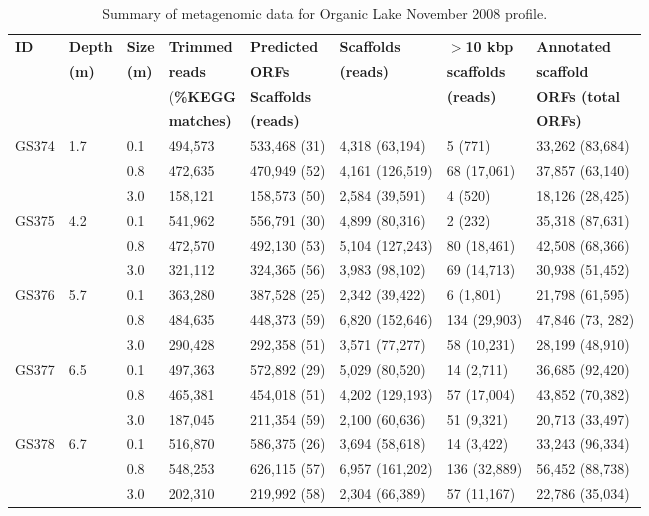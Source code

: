 \begin{table}
\footnotesize
\caption[Summary of metagenomic data for Organic Lake profile]{Summary of metagenomic data for Organic Lake November 2008 profile.}
\label{tab:metag}
\smallskip
\begin{tabularx}{\textwidth}{p{0.7cm}p{0.8cm}p{0.6cm}p{1.2cm}p{1.8cm}Xp{1.8cm}X}
\toprule
\textbf{ID} & \textbf{Depth} & \textbf{Size}         & \textbf{Trimmed}      & \textbf{Predicted} & \textbf{Scaffolds} & \textbf{$>$10 kbp} & \textbf{Annotated} \\
            & \textbf{(m)}   & \textbf{(\textmu{}m)} & \textbf{reads}        & \textbf{\acp{ORF}} & \textbf{(reads)}   & \textbf{scaffolds} & \textbf{scaffold} \\
            &                &                       & (\textbf{\%\ac{KEGG}} & \textbf{Scaffolds} &                    & \textbf{(reads)}   & \textbf{\acp{ORF} (total} \\
            &                &                       & \textbf{matches)}     & \textbf{(reads)}   &                    &                    & \textbf{\acp{ORF}) } \\
\midrule
GS374 & 1.7 & 0.1 & 494,573 & 533,468 (31) & 4,318 (63,194) & 5 (771) & 33,262 (83,684)\\
 &  & 0.8 & 472,635 & 470,949 (52) & 4,161 (126,519) & 68 (17,061) & 37,857 (63,140)\\
 &  & 3.0 & 158,121 & 158,573 (50) & 2,584 (39,591) & 4 (520) & 18,126 (28,425)\\
GS375 & 4.2 & 0.1 & 541,962 & 556,791 (30) & 4,899 (80,316) & 2 (232) & 35,318 (87,631)\\
 &  & 0.8 & 472,570 & 492,130 (53) & 5,104 (127,243) & 80 (18,461) & 42,508 (68,366)\\
 &  & 3.0 & 321,112 & 324,365 (56) & 3,983 (98,102) & 69 (14,713) & 30,938 (51,452)\\
GS376 & 5.7 & 0.1 & 363,280 & 387,528 (25) & 2,342 (39,422) & 6 (1,801) & 21,798 (61,595)\\
 &  & 0.8 & 484,635 & 448,373 (59) & 6,820 (152,646) & 134 (29,903) & 47,846 (73, 282)\\
 &  & 3.0 & 290,428 & 292,358 (51) & 3,571 (77,277) & 58 (10,231) & 28,199 (48,910)\\
GS377 & 6.5 & 0.1 & 497,363 & 572,892 (29) & 5,029 (80,520) & 14 (2,711) & 36,685 (92,420)\\
 &  & 0.8 & 465,381 & 454,018 (51) & 4,202 (129,193) & 57 (17,004) & 43,852 (70,382)\\
 &  & 3.0 & 187,045 & 211,354 (59) & 2,100 (60,636) & 51 (9,321) & 20,713 (33,497)\\
GS378 & 6.7 & 0.1 & 516,870 & 586,375 (26) & 3,694 (58,618) & 14 (3,422) & 33,243 (96,334)\\
 &  & 0.8 & 548,253 & 626,115 (57) & 6,957 (161,202) & 136 (32,889) & 56,452 (88,738)\\
 &  & 3.0 & 202,310 & 219,992 (58) & 2,304 (66,389) & 57 (11,167) & 22,786 (35,034)\\
\bottomrule
\end{tabularx}
\end{table}
